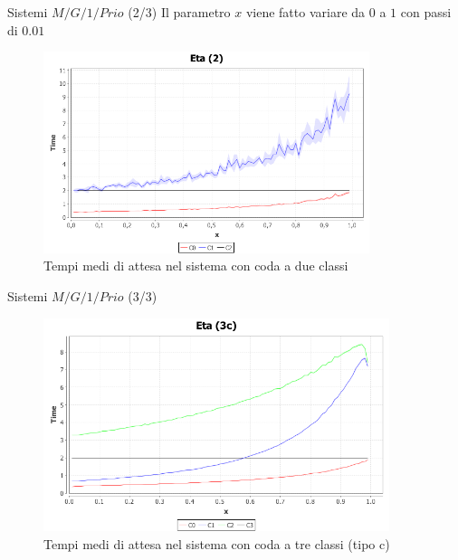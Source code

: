 \documentclass[slidestop,compress,mathserif]{beamer}
\begin{document}
\begin{frame}{Sistemi $M/G/1/Prio$ (2/3)}
Il parametro $x$ viene fatto variare da $0$ a $1$ con passi di $0.01$
\footnotesize
\begin{figure}[!h]{
	\begin{center}
	   \includegraphics[width=0.85\textwidth]{figures/mg1prio2low.png}
	\end{center}}
	\caption{Tempi medi di attesa nel sistema con coda a due classi}
	\label{fig:mg1prio2low}
\end{figure}
\normalsize
\end{frame}

\begin{frame}{Sistemi $M/G/1/Prio$ (3/3)}
\begin{figure}[!h]{
	\begin{center}
	   \includegraphics[width=0.9\textwidth]{figures/MG1PRIO3c[mu=2,runs=10000,arrivals=1000].png}
	\end{center}}
	\caption{Tempi medi di attesa nel sistema con coda a tre classi (tipo c)}
	\label{fig:mg1prio3c}
\end{figure}
\end{frame}
\end{document}
